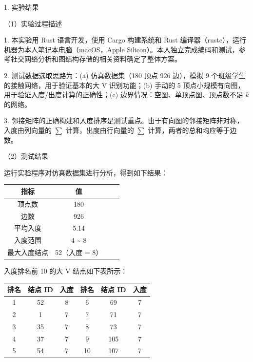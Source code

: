 \noindent\hspace*{2em}1. 实验结果\par
\noindent\hspace*{2em}（1）实验过程描述\par
\noindent\hspace*{2em}1. 本实验用 Rust 语言开发，使用 Cargo 构建系统和 Rust 编译器（rustc），运行机器为本人笔记本电脑（macOS，Apple Silicon）。本人独立完成编码和测试，参考社交网络分析和图结构存储的相关资料确定了整体方案。\par
\noindent\hspace*{2em}2. 测试数据选取思路为：(a) 仿真数据集（180 顶点 926 边），模拟 9 个班级学生的接触网络，用于验证基本的大 V 识别功能；(b) 手动的 5 顶点小规模有向图，用于验证入度/出度计算的正确性；(c) 边界情况：空图、单顶点图、顶点数不足 $k$ 的网络。\par
\noindent\hspace*{2em}3. 邻接矩阵的正确构建和入度排序是测试重点。由于有向图的邻接矩阵非对称，入度由列向量的 $\sum$ 计算，出度由行向量的 $\sum$ 计算，两者的总和均应等于边数。\par
\noindent\hspace*{2em}（2）测试结果\par
\noindent\hspace*{2em}运行实验程序对仿真数据集进行分析，得到如下结果：\par
\begin{center}
\fontsize{9pt}{12pt}\selectfont
\renewcommand{\arraystretch}{1.25}
\begin{tabular}{|c|c|c|c|}
\hline
\textbf{指标} & \textbf{值} \\ \hline
顶点数 & 180 \\ \hline
边数 & 926 \\ \hline
平均入度 & 5.14 \\ \hline
入度范围 & 4 \~{} 8 \\ \hline
最大入度结点 & 52（入度 = 8）\\ \hline
\end{tabular}
\end{center}
\noindent\hspace*{2em}入度排名前 10 的大 V 结点如下表所示：\par

\begin{center}
\fontsize{9pt}{12pt}\selectfont
\renewcommand{\arraystretch}{1.2}
\begin{tabular}{|c|c|c||c|c|c|}
\hline
\textbf{排名} & \textbf{结点 ID} & \textbf{入度} & \textbf{排名} & \textbf{结点 ID} & \textbf{入度} \\ \hline
1 & 52 & 8 & 6 & 69 & 7 \\ \hline
2 & 1  & 7 & 7 & 71 & 7 \\ \hline
3 & 35 & 7 & 8 & 73 & 7 \\ \hline
4 & 37 & 7 & 9 & 105 & 7 \\ \hline
5 & 54 & 7 & 10 & 107 & 7 \\ \hline
\end{tabular}
\end{center}

